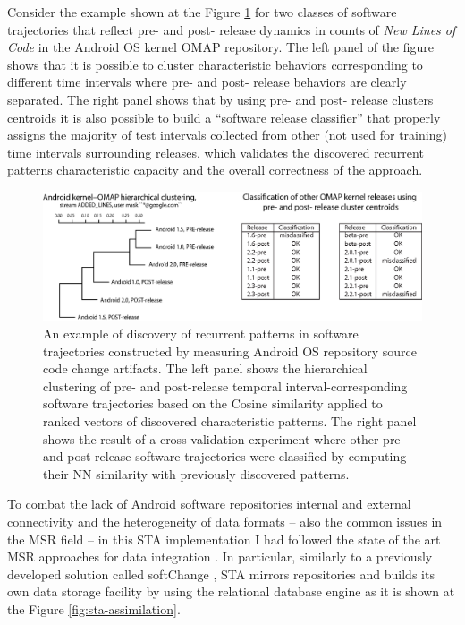 Consider the example shown at the Figure \ref{fig:STA2-results} for two classes of software trajectories that reflect pre- and post- 
release dynamics in counts of \textit{New Lines of Code} in the Android OS kernel OMAP repository. 
The left panel of the figure shows that it is possible to cluster characteristic behaviors corresponding to different time intervals 
where pre- and post- release behaviors are clearly separated. 
The right panel shows that by using pre- and post- release clusters centroids it is also possible to build a ``software release classifier''
that properly assigns the majority of test intervals collected from other (not used for training) time intervals surrounding releases. 
which validates the discovered recurrent patterns characteristic capacity and the overall correctness of the approach.

\begin{figure}[t]
   \centering
   \includegraphics[width=145mm]{figures/STA2.eps}
   \caption{An example of discovery of recurrent patterns in software trajectories constructed by measuring Android OS 
   repository source code change artifacts.
   The left panel shows the hierarchical clustering of pre- and post-release temporal interval-corresponding software 
   trajectories based on the Cosine similarity applied to ranked vectors of discovered characteristic patterns.
   The right panel shows the result of a cross-validation experiment where other pre- and post-release software trajectories 
   were classified by computing their NN similarity with previously discovered patterns.}
   \label{fig:STA2-results}
\end{figure}

To combat the lack of Android software repositories internal and external connectivity and the heterogeneity 
of data formats -- also the common issues in the MSR field -- in this STA implementation I had followed the state of 
the art MSR approaches for data integration \cite{citeulike:13058334} \cite{cvsanaly}. 
In particular, similarly to a previously developed solution called softChange \cite{german04_softchange}, STA mirrors 
repositories and builds its own data storage facility by using the relational database engine as it is shown at 
the Figure \ref{fig:sta-assimilation}.

